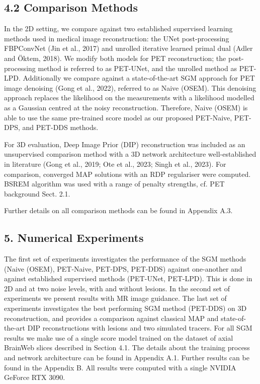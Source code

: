 \documentclass{article}
\begin{document}
\subsection{4.2 Comparison Methods}

In the 2D setting, we compare against two established supervised learning methods used in medical image reconstruction: the UNet post-processing FBPConvNet (Jin et al., 2017) and unrolled iterative learned primal dual (Adler and Öktem, 2018). We modify both models for PET reconstruction; the post-processing method is referred to as PET-UNet, and the unrolled method as PET-LPD. Additionally we compare against a state-of-the-art SGM approach for PET image denoising (Gong et al., 2022), referred to as Naive (OSEM). This denoising approach replaces the likelihood on the measurements with a likelihood modelled as a Gaussian centred at the noisy reconstruction. Therefore, Naive (OSEM) is able to use the same pre-trained score model as our proposed PET-Naive, PET-DPS, and PET-DDS methods.

For 3D evaluation, Deep Image Prior (DIP) reconstruction was included as an unsupervised comparison method with a 3D network architecture well-established in literature (Gong et al., 2019; Ote et al., 2023; Singh et al., 2023). For comparison, converged MAP solutions with an RDP regulariser were computed. BSREM algorithm was used with a range of penalty strengths, cf. PET background Sect. 2.1.

Further details on all comparison methods can be found in Appendix A.3.

\subsection{5. Numerical Experiments}

The first set of experiments investigates the performance of the SGM methods (Naive (OSEM), PET-Naive, PET-DPS, PET-DDS) against one-another and against established supervised methods (PET-UNet, PET-LPD). This is done in 2D and at two noise levels, with and without lesions. In the second set of experiments we present results with MR image guidance. The last set of experiments investigates the best performing SGM method (PET-DDS) on 3D reconstruction, and provides a comparison against classical MAP and state-of-the-art DIP reconstructions with lesions and two simulated tracers. For all SGM results we make use of a single score model trained on the dataset of axial BrainWeb slices described in Section 4.1. The details about the training process and network architecture can be found in Appendix A.1. Further results can be found in the Appendix B. All results were computed with a single NVIDIA GeForce RTX 3090.
\end{document}
